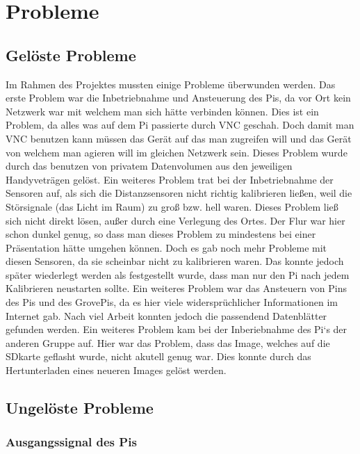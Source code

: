 \documentclass[notitlepage]{report}
\begin{document}
\section{Probleme}

\subsection{Gel\"{o}ste Probleme}

Im Rahmen des Projektes mussten einige Probleme \"{u}berwunden werden. Das erste Problem war die Inbetriebnahme und Ansteuerung des Pis, da vor Ort kein Netzwerk war mit welchem man sich h\"{a}tte verbinden k\"{o}nnen. Dies ist ein Problem, da alles was auf dem Pi passierte durch VNC geschah. Doch damit man VNC benutzen kann m\"{u}ssen das Ger\"{a}t auf das man zugreifen will und das Ger\"{a}t von welchem man agieren will im gleichen Netzwerk sein. Dieses Problem wurde durch das benutzen von privatem Datenvolumen aus den jeweiligen Handyvetr\"{a}gen gel\"{o}st. Ein weiteres Problem trat bei der Inbetriebnahme der Sensoren auf, als sich die Distanzsensoren nicht richtig kalibrieren lie{\ss}en, weil die St\"{o}rsignale (das Licht im Raum) zu gro{\ss} bzw. hell waren. Dieses Problem lie{\ss} sich nicht direkt l\"{o}sen, au{\ss}er durch eine Verlegung des Ortes. Der Flur war hier schon dunkel genug, so dass man dieses Problem zu mindestens bei einer Pr\"{a}sentation h\"{a}tte umgehen k\"{o}nnen. Doch es gab noch mehr Probleme mit diesen Sensoren, da sie scheinbar nicht zu kalibrieren waren. Das konnte jedoch sp\"{a}ter wiederlegt werden als festgestellt wurde, dass man nur den Pi nach jedem Kalibrieren neustarten sollte. Ein weiteres Problem war das Ansteuern von Pins des Pis und des GrovePis, da es hier viele widerspr\"{u}chlicher Informationen im Internet gab. Nach viel Arbeit konnten jedoch die passendend Datenbl\"{a}tter gefunden werden. Ein weiteres Problem kam bei der Inberiebnahme des Pi`s der anderen Gruppe auf. Hier war das Problem, dass das Image, welches auf die SDkarte geflasht wurde, nicht akutell genug war. Dies konnte durch das Hertunterladen eines neueren Images gel\"{o}st werden.

\subsection{Ungel\"{o}ste Probleme}

\subsubsection{Ausgangssignal des Pis}
\end{document}
